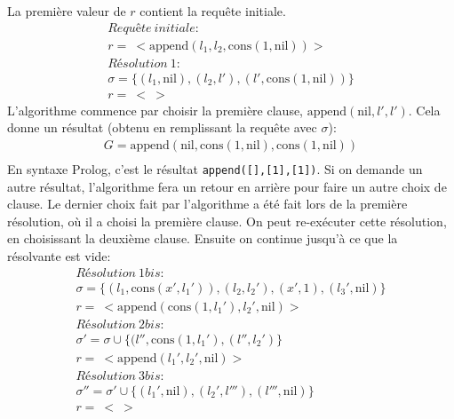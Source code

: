 La première valeur de $r$ contient la requête initiale.
\begin{equation}
\begin{array}{l}
\mathit{Requête\ initiale:} \\
r =\ < \mathrm{append}(l_1, l_2, \mathrm{cons}(1,\mathrm{nil})) > \\
\mathit{Résolution\ 1:} \\
\sigma = \{ (l_1,\mathrm{nil}), (l_2, l'), (l',\mathrm{cons}(1,\mathrm{nil})) \} \\
r =\ <\ >
\end{array}
\end{equation}
L'algorithme commence par choisir la première clause, $\mathrm{append}(\mathrm{nil},l',l')$.
Cela donne un résultat (obtenu en remplissant la requête avec $\sigma$):
\begin{equation}
\begin{array}{l}
G = \mathrm{append}(\mathrm{nil}, \mathrm{cons}(1,\mathrm{nil}), \mathrm{cons}(1,\mathrm{nil})) \\
\end{array}
\end{equation}
En syntaxe Prolog, c'est le résultat \verb+append([],[1],[1])+.
Si on demande un autre résultat,
l'algorithme fera un retour en arrière pour faire un autre choix de clause.
Le dernier choix fait par l'algorithme a été fait lors de la première résolution,
où il a choisi la première clause.
On peut re-exécuter cette résolution, en choisissant la deuxième clause.
Ensuite on continue jusqu'à ce que la résolvante est vide:
\begin{equation}
\begin{array}{l}
\mathit{Résolution\ 1bis:} \\
\sigma = \{ (l_1,\mathrm{cons}(x',l_1')), (l_2,l_2'), (x',1), (l_3',\mathrm{nil}) \} \\
r =\ < \mathrm{append}(\mathrm{cons}(1,l_1'), l_2', \mathrm{nil}) > \\
\mathit{Résolution\ 2bis:} \\
\sigma' = \sigma \cup \{ (l'',\mathrm{cons}(1,l_1'), (l'',l_2') \} \\
r =\ < \mathrm{append}(l_1', l_2', \mathrm{nil})> \\
\mathit{Résolution\ 3bis:} \\
\sigma'' = \sigma' \cup \{ (l_1',\mathrm{nil}), (l_2',l'''), (l''',\mathrm{nil}) \} \\
r =\ <\ >
\end{array}
\end{equation}
